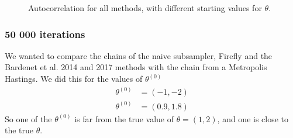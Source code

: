 \begin{figure}
    \caption{Autocorrelation for all methods, with different starting values for $\theta$. }%
    \label{fig:autocorrelation_10k_02_06}%
\end{figure}



\subsubsection{50 000 iterations}
We wanted to compare the chains of the naive subsampler, Firefly and the Bardenet et al. 2014 and 2017 methods with the chain from a Metropolis Hastings. We did this for the values of $\theta^{\left(0\right)}$
\begin{equation*}
\begin{split}
     \theta^{\left(0\right)} &= \left(-1, -2\right) \\
     \theta^{\left(0\right)} & = \left(0.9, 1.8\right)
\end{split}
\end{equation*}
So one of the $\theta^{\left(0\right)}$ is far from the true value of $\theta = \left(1,2\right)$, and one is close to the true $\theta$.   

